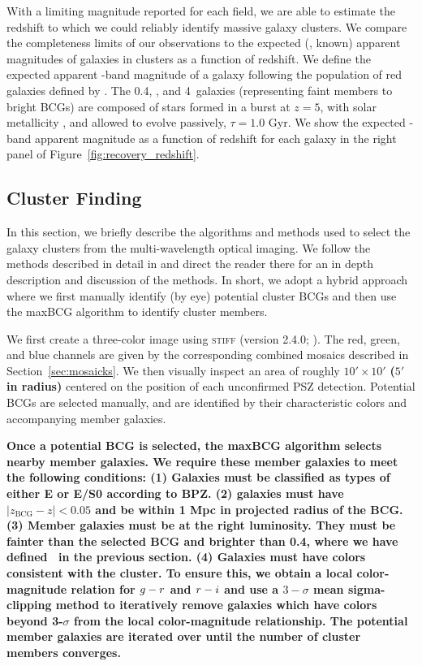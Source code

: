 \documentclass[apj, revtex4-1]{emulateapj}
\begin{document}
With a limiting magnitude reported for each field, we are able to estimate the redshift to which we could reliably identify massive galaxy clusters. We compare the completeness limits of our observations to the expected (\ie, known) apparent magnitudes of galaxies in clusters as a function of redshift. We define the expected apparent \sdssi-band magnitude of a galaxy following the population of red galaxies defined by \cite{Blanton2003}. The 0.4\lstar, \lstar, and 4\lstar\ galaxies (representing faint members to bright BCGs) are composed of stars formed in a burst at $z = 5$, with solar metallicity \citep{Bruzual2003}, and allowed to evolve passively, $\tau = 1.0$ Gyr. We show the expected \sdssi-band apparent magnitude as a function of redshift for each galaxy in the right panel of Figure~\ref{fig:recovery_redshift}.

\subsection{Cluster Finding}
In this section, we briefly describe the algorithms and methods used to select the galaxy clusters from the multi-wavelength optical imaging. We follow the methods described in detail in \cite{Menanteau2009a, Menanteau2010} and direct the reader there for an in depth description and discussion of the methods. In short, we adopt a hybrid approach where we first manually identify (by eye) potential cluster BCGs and then use the maxBCG algorithm \citep{Koester2007} to identify cluster members.

We first create a three-color image using \textsc{stiff} (version 2.4.0; \citealt{Bertin2011}). The red, green, and blue channels are given by the corresponding combined mosaics described in Section~\ref{sec:mosaicks}. We then visually inspect an area of roughly $10' \times 10'$ \textbf{($5'$ in radius)} centered on the position of each unconfirmed PSZ detection. Potential BCGs are selected manually, and are identified by their characteristic colors and accompanying member galaxies.

\textbf{Once a potential BCG is selected, the maxBCG algorithm selects nearby member galaxies. We require these member galaxies to meet the following conditions: (1) Galaxies must be classified as types of either E or E/S0 according to BPZ. (2) galaxies must have $|z_\mathrm{BCG} - z| < 0.05$ and be within 1 Mpc in projected radius of the BCG. (3) Member galaxies must be at the right luminosity. They must be fainter than the selected BCG and brighter than 0.4\lstar, where we have defined \lstar\ in the previous section. (4) Galaxies must have colors consistent with the cluster. To ensure this, we obtain a local color-magnitude relation for $\hbox{$g$}-\hbox{$r$}$ and $\hbox{$r$}-\hbox{$i$}$ and use a $3-\sigma$ mean sigma-clipping method to iteratively remove galaxies which have colors beyond 3-$\sigma$ from the local color-magnitude relationship. The potential member galaxies are iterated over until the number of cluster members converges.}
\end{document}
